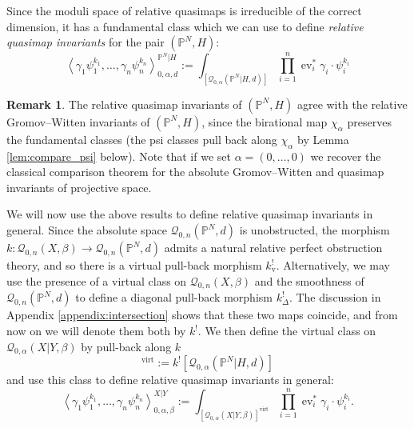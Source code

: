 \documentclass[10pt]{amsart}
\newcommand{\Q}[4]{\mathcal{Q}_{#1,#2}(#3,#4)}
\newcommand{\PP}{\mathbb P}
\renewcommand{\to}{\rightarrow}
\newcommand{\virt}[1]{[#1]^{\operatorname{virt}}}
\newcommand{\ev}{\operatorname{ev}}
\theoremstyle{definition}
\theoremstyle{definition}
\newtheorem{remark}[thm]{Remark}
\begin{document}
Since the moduli space of relative quasimaps is irreducible of the correct dimension, it has a fundamental class which we can use to define \emph{relative quasimap invariants} for the pair $(\PP^N,H)$:
\begin{equation*} \left\langle \gamma_1 \psi_1^{k_1} , \ldots, \gamma_n \psi_n^{k_n} \right\rangle_{0,\alpha,d}^{\PP^N|H} := \int_{[\Q{0}{\alpha}{\PP^N|H}{d}]} \prod_{i=1}^n \ev_i^* \gamma_i \cdot \psi_i^{k_i} \end{equation*}

\begin{remark}
The relative quasimap invariants of $(\PP^N,H)$ agree with the relative Gromov--Witten invariants of $(\PP^N,H)$, since the birational map $\chi_\alpha$ preserves the fundamental classes (the psi classes pull back along $\chi_\alpha$ by Lemma \ref{lem:compare_psi} below). Note that if we set $\alpha=(0,\ldots,0)$ we recover the classical comparison theorem for the absolute Gromov--Witten and quasimap invariants of projective space.
\end{remark}

We will now use the above results to define relative quasimap invariants in general. Since the absolute space $\Q{0}{n}{\PP^N}{d}$ is unobstructed, the morphism $k\colon\Q{0}{n}{X}{\beta}\to \Q{0}{n}{\PP^N}{d}$ admits a natural relative perfect obstruction theory, and so there is a virtual pull-back morphism $k^!_{\operatorname{v}}$. Alternatively, we may use the presence of a virtual class on $\Q{0}{n}{X}{\beta}$ and the smoothness of $\Q{0}{n}{\PP^N}{d}$ to define a diagonal pull-back morphism $k^!_{\Delta}$. The discussion in Appendix \ref{appendix:intersection} shows that these two maps coincide, and from now on we will denote them both by $k^!$. We then define the virtual class on $\Q{0}{\alpha}{X|Y}{\beta}$ by pull-back along $k$
\begin{equation*} \virt{\Q{0}{\alpha}{X|Y}{\beta}} := k^! [ \Q{0}{\alpha}{\PP^N|H}{d} ] \end{equation*}
and use this class to define relative quasimap invariants in general:
\begin{equation*} \left\langle \gamma_1 \psi_1^{k_1} , \ldots, \gamma_n \psi_n^{k_n} \right\rangle_{0,\alpha,\beta}^{X|Y} := \int_{\virt{\Q{0}{\alpha}{X|Y}{\beta}}} \prod_{i=1}^n \ev_i^* \gamma_i \cdot \psi_i^{k_i}. \end{equation*}
\end{document}
